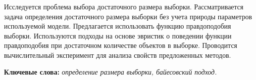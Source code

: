 Исследуется проблема выбора достаточного размера выборки. Рассматривается задача определения достаточного размера выборки без учета природы параметров используемой модели. Предлагается использовать функцию правдоподобия выборки. Используются подходы на основе эвристик о поведении функции правдоподобия при достаточном количестве объектов в выборке. Проводится вычислительный эксперимент для анализа свойств предложенных методов.
  
\textbf{Ключевые слова:} \emph{определение размера выборки, байесовский подход.}
